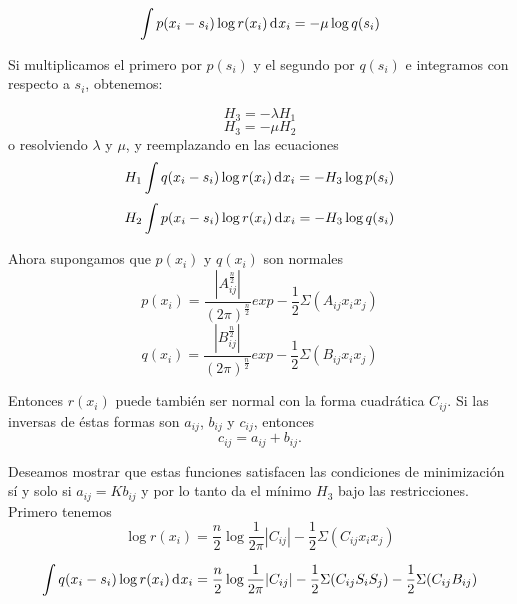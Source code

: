 \begin{appendices}
\begin{equation} \int p(x_{i} - s_{i}) \log r(x_{i})  \diff x _{i} = -\mu \log q(s_{i}) \end{equation}
				
Si multiplicamos el primero por $p(s_{i})$ y el segundo por $q(s_{i})$ e integramos con 
respecto a $s_{i}$, obtenemos:

\begin{equation} H_{3} = -\lambda H_{1} \end{equation}
\begin{equation} H_{3} = -\mu H_{2} \end{equation}
o resolviendo $\lambda$ y $\mu$, y reemplazando en las ecuaciones
\begin{equation} H_{1} \int q(x_{i} - s_{i}) \log r(x_{i})  \diff x _{i} 
= - H_{3} \log p(s_{i}) 
\end{equation}
\begin{equation} H_{2} \int p(x_{i} - s_{i}) \log r(x_{i})  \diff x _{i} 
= - H_{3} \log q(s_{i}) \end{equation}

Ahora supongamos que $p(x_{i})$ y $q(x_{i})$ son normales
\begin{equation} p(x_{i}) = \frac{|A_{ij}^{\frac{n}{2}}|}{(2\pi)^{\frac{n}{2}}} exp - \frac{1}{2} \Sigma(A_{ij} x_{i} x_{j}) \end{equation}
\begin{equation} q(x_{i}) = \frac{|B_{ij}^{\frac{n}{2}}|}{(2\pi)^{\frac{n}{2}}} exp - \frac{1}{2} \Sigma(B_{ij} x_{i} x_{j}) \end{equation}

Entonces $r(x_{i})$ puede tambi\'en ser normal con la forma
cuadr\'atica $C_{ij}$. Si las inversas de \'estas formas son $a_{ij}$,
$b_{ij}$ y $c_{ij}$, entonces
\begin{equation} c_{ij} = a_{ij} + b_{ij}. \end{equation}
				
Deseamos mostrar que estas funciones satisfacen las condiciones de
minimizaci\'on s\'i y solo si $a_{ij} = Kb_{ij}$ y por lo tanto da el
m\'inimo $H_{3}$ bajo las restricciones. Primero tenemos
\begin{equation} \log r(x_{i}) = 
\frac{n}{2} \log \frac{1}{2\pi} |C_{ij}| - \frac{1}{2} 
\Sigma(C_{ij} x_{i} x_{j}) \end{equation}
			
\begin{equation} 
\int q(x_{i} - s_{i}) \log r(x_{i})  \diff x _{i} = \frac{n}{2} \log
\frac{1}{2\pi} |C_{ij}| - \frac{1}{2} \Sigma(C_{ij}S_{i}S_{j}) -
\frac{1}{2} \Sigma(C_{ij} B_{ij}) \end{equation}
		

\end{appendices}
